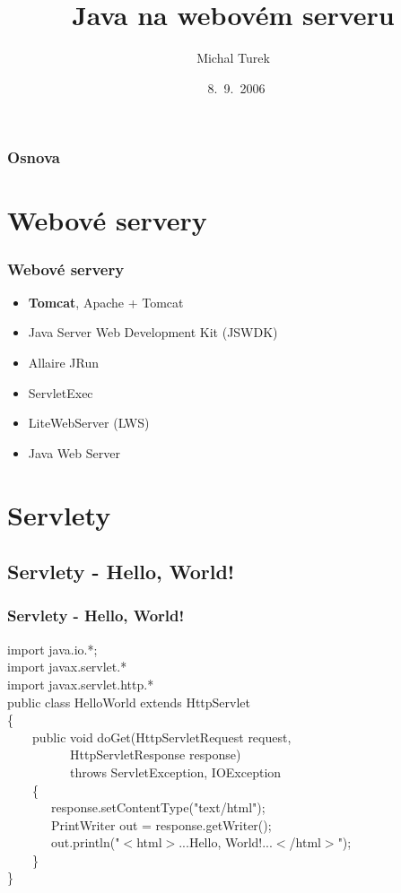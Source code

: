 \documentclass{beamer}
\title{Java na webovém serveru}
\author{Michal Turek}
\institute[US JAK]{FEL ČVUT Praha}
\date{~8.~9.~2006}
\begin{document}
\begin{frame}
  \titlepage
\end{frame}


\begin{frame}
  \frametitle{Osnova}
  \tableofcontents
\end{frame}


\section{Webové servery}

\begin{frame}
  \frametitle{Webové servery}
    \begin{itemize}
      \item {\bf Tomcat}, Apache + Tomcat
      \item Java Server Web Development Kit (JSWDK)
      \item Allaire JRun
      \item ServletExec
      \item LiteWebServer (LWS)
      \item Java Web Server
    \end{itemize}
\end{frame}


\section{Servlety}

\subsection{Servlety - Hello, World!}

\begin{frame}
  \frametitle{Servlety - Hello, World!}
import java.io.*;\\
import javax.servlet.*\\
import javax.servlet.http.*\\
public class HelloWorld extends HttpServlet\\
\{\\
\ \ \ \ public void doGet(HttpServletRequest request,\\
\ \ \ \ \ \ \ \ \ \ HttpServletResponse response)\\
\ \ \ \ \ \ \ \ \ \ throws ServletException, IOException\\
\ \ \ \ \{\\
\ \ \ \ \ \ \ response.setContentType("text/html");\\
\ \ \ \ \ \ \ PrintWriter out = response.getWriter();\\
\ \ \ \ \ \ \ out.println("$<$html$>$...Hello, World!...$<$/html$>$");\\
\ \ \ \ \}\\
\}\\
\end{frame}
\end{document}
